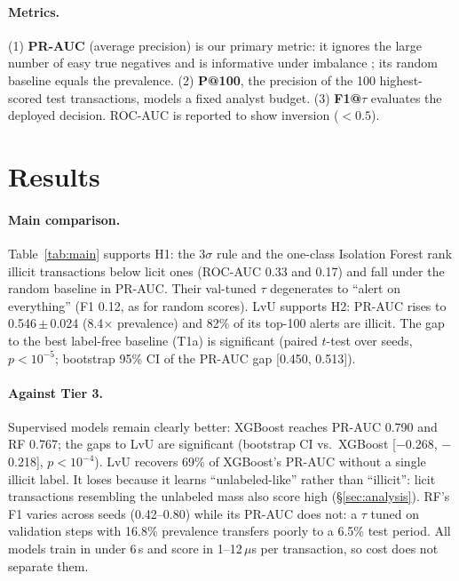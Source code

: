\documentclass[11pt]{article}
\newcommand{\ours}{LvU}
\begin{document}
\paragraph{Metrics.}
(1) \textbf{PR-AUC} (average precision) is our primary metric: it ignores the large number of easy true negatives and is informative under imbalance \citep{saito2015prc}; its random baseline equals the prevalence.
(2) \textbf{P@100}, the precision of the 100 highest-scored test transactions, models a fixed analyst budget.
(3) \textbf{F1@$\tau$} evaluates the deployed decision.
ROC-AUC is reported to show inversion ($<0.5$).

\section{Results}
\label{sec:results}

\begin{table}[t]
\centering\small
\setlength{\tabcolsep}{2.6pt}

\caption{Test results (labeled transactions of steps 35--49), mean\,$\pm$\,std over 5 seeds (deterministic methods: one run). F1 uses $\tau$ tuned on validation (3$\sigma$ rule: $\tau=3$). Best per column in bold. Period columns split the test set at the dark-market shutdown (step 43).}
\label{tab:main}
\end{table}

\paragraph{Main comparison.}
Table~\ref{tab:main} supports H1: the 3$\sigma$ rule and the one-class Isolation Forest rank illicit transactions below licit ones (ROC-AUC 0.33 and 0.17) and fall under the random baseline in PR-AUC.
Their val-tuned $\tau$ degenerates to ``alert on everything'' (F1 0.12, as for random scores).
\ours{} supports H2: PR-AUC rises to 0.546\,$\pm$\,0.024 (8.4$\times$ prevalence) and 82\% of its top-100 alerts are illicit.
The gap to the best label-free baseline (T1a) is significant (paired $t$-test over seeds, $p<10^{-5}$; bootstrap 95\% CI of the PR-AUC gap [0.450, 0.513]).

\paragraph{Against Tier 3.}
Supervised models remain clearly better: XGBoost reaches PR-AUC 0.790 and RF 0.767; the gaps to \ours{} are significant (bootstrap CI vs.\ XGBoost [$-$0.268, $-$0.218], $p<10^{-4}$).
\ours{} recovers 69\% of XGBoost's PR-AUC without a single illicit label.
It loses because it learns ``unlabeled-like'' rather than ``illicit'': licit transactions resembling the unlabeled mass also score high (\S\ref{sec:analysis}).
RF's F1 varies across seeds (0.42--0.80) while its PR-AUC does not: a $\tau$ tuned on validation steps with 16.8\% prevalence transfers poorly to a 6.5\% test period.
All models train in under 6\,s and score in 1--12\,$\mu$s per transaction, so cost does not separate them.
\end{document}
